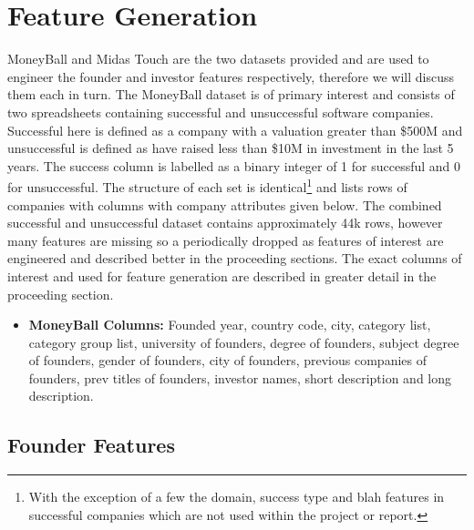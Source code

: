 \documentclass{article}
\begin{document}

\section{Feature Generation}
\label{sec:feature_generation}

MoneyBall and Midas Touch are the two datasets provided and are used to engineer the founder and investor features respectively, therefore we will discuss them each in turn. The MoneyBall dataset is of primary interest and consists of two spreadsheets containing successful and unsuccessful software companies. Successful here is defined as a company with a valuation greater than \$500M and unsuccessful is defined as have raised less than \$10M in investment in the last 5 years. The success column is labelled as a binary integer of 1 for successful and 0 for unsuccessful. The structure of each set is identical\footnote{With the exception of a few the domain, success type and blah features in successful companies which are not used within the project or report.} and lists rows of companies with columns with company attributes given below. The combined successful and unsuccessful dataset contains approximately 44k rows, however many features are missing so a periodically dropped as features of interest are engineered and described better in the proceeding sections. The exact columns of interest and used for feature generation are described in greater detail in the proceeding section. 

\begin{itemize}
	\item[]\textbf{MoneyBall Columns:} Founded year, country code, city, category list, category group list, university of founders, degree of founders, subject degree of founders, gender of founders, city of founders, previous companies of founders, prev titles of founders, investor names, short description and long description.
\end{itemize}

\subsection{Founder Features}
\end{document}
